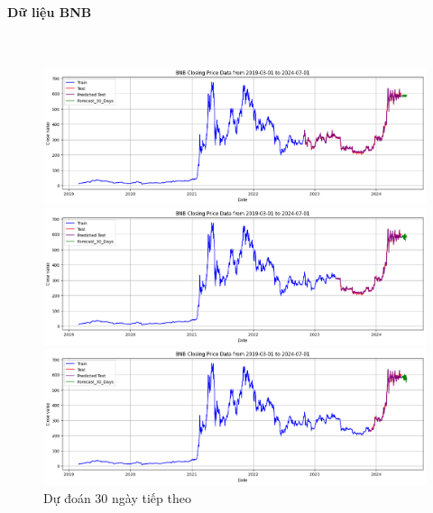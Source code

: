 \documentclass[conference]{IEEEtran}
\begin{document}
\paragraph{\textbf{Dữ liệu BNB}} \mbox{} \\
\begin{figure}[H]
    \centering
    \begin{minipage}{0.15\textwidth}
    \centering
    
    \includegraphics[width=1\textwidth]{Figure/RandomForest_BNB_30days_73.png}
    \end{minipage}
    \hfill
    \begin{minipage}{0.15\textwidth}
    \centering
    \includegraphics[width=1\textwidth]{Figure/RandomForest_BNB_30days_82.png}
    \end{minipage}
    \hfill
    \begin{minipage}{0.15\textwidth}
    \centering
    \includegraphics[width=1\textwidth]{Figure/RandomForest_BNB_30days_91.png}
    \end{minipage}
    \caption{Dự đoán 30 ngày tiếp theo}
    \label{fig:1}
\end{figure}
\end{document}
